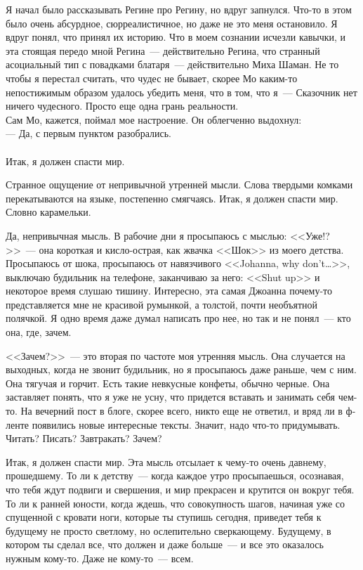 Я начал было рассказывать Регине про Регину, но вдруг запнулся. Что-то в этом 
было очень абсурдное, сюрреалистичное, но даже не это меня остановило. Я вдруг 
понял, что принял их историю. Что в моем сознании исчезли кавычки, и эта 
стоящая передо мной Регина~--- действительно Регина, что странный асоциальный тип с 
повадками блатаря~--- действительно Миха Шаман. Не то чтобы я перестал считать, 
что чудес не бывает, скорее Мо каким-то непостижимым образом удалось убедить 
меня, что в том, что я~--- Сказочник нет ничего чудесного. Просто еще одна 
грань реальности.\\
Сам Мо, кажется, поймал мое настроение. Он облегченно выдохнул:\\
--- Да, с первым пунктом разобрались.\\
~\\

Итак, я должен спасти мир.

Странное ощущение от непривычной утренней мысли. Слова твердыми комками 
перекатываются на языке, постепенно смягчаясь. Итак, я должен спасти мир. 
Словно карамельки.


Да, непривычная мысль. В рабочие дни я просыпаюсь с мыслью: <<Уже!?>>~--- она 
короткая и кисло-острая, как жвачка <<Шок>> из моего детства. Просыпаюсь от 
шока, просыпаюсь от навязчивого <<Johanna, why don't\ldots >>, выключаю будильник на 
телефоне, заканчиваю за него: <<Shut up>> и некоторое время слушаю тишину. 
Интересно, эта самая Джоанна почему-то представляется мне не красивой румынкой, 
а толстой, почти необъятной полячкой. Я одно время даже думал написать про нее, 
но так и не понял~--- кто она, где, зачем.

<<Зачем?>>~--- это вторая по частоте моя утренняя мысль. Она случается на 
выходных, 
когда не звонит будильник, но я просыпаюсь даже раньше, чем с ним. Она тягучая 
и горчит. Есть такие невкусные конфеты, обычно черные. Она заставляет понять, что 
я уже не усну, что придется вставать и занимать себя чем-то. На вечерний пост в 
блоге, скорее всего, никто еще не ответил, и вряд ли в ф-ленте появились новые 
интересные тексты. Значит, надо что-то придумывать. Читать? Писать? Завтракать? 
Зачем?

Итак, я должен спасти мир. Эта мысль отсылает к чему-то очень давнему, 
прошедшему. То ли к детству~--- когда каждое утро просыпаешься, осознавая, что 
тебя ждут подвиги и свершения, и мир прекрасен и крутится он вокруг тебя. То ли 
к ранней юности, когда ждешь, что совокупность шагов, начиная уже со спущенной 
с кровати ноги, которые ты ступишь сегодня, приведет тебя к будущему не просто 
светлому, но ослепительно сверкающему. Будущему, в котором ты сделал все, что 
должен и даже больше~--- и все это оказалось нужным кому-то. Даже не 
кому-то~--- 
всем.


